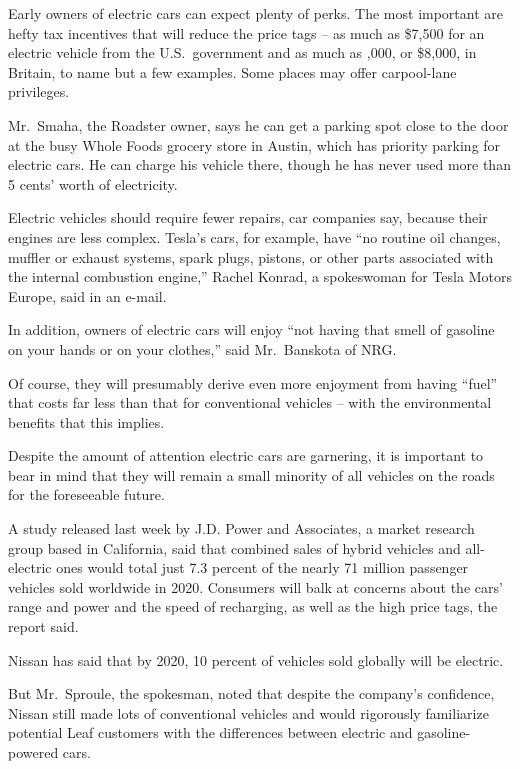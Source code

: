 ﻿\documentclass[12pt]{article}
\begin{document}
Early owners of electric cars can expect plenty of perks. The most important are hefty tax
incentives that will reduce the price tags -- as much as \$7,500 for an electric vehicle from the
U.S.~government and as much as ,000, or \$8,000, in Britain, to name but a few
examples. Some places may offer carpool-lane privileges.

Mr.~Smaha, the Roadster owner, says he can get a parking spot close to the door at the busy Whole
Foods grocery store in Austin, which has priority parking for electric cars. He can charge his
vehicle there, though he has never used more than 5 cents' worth of electricity.

Electric vehicles should require fewer repairs, car companies say, because their engines are less
complex. Tesla's cars, for example, have ``no routine oil changes, muffler or exhaust systems, spark
plugs, pistons, or other parts associated with the internal combustion engine,'' Rachel Konrad, a
spokeswoman for Tesla Motors Europe, said in an e-mail.

In addition, owners of electric cars will enjoy ``not having that smell of gasoline on your hands or
on your clothes,'' said Mr.~Banskota of NRG.

Of course, they will presumably derive even more enjoyment from having ``fuel'' that costs far less
than that for conventional vehicles -- with the environmental benefits that this implies.

Despite the amount of attention electric cars are garnering, it is important to bear in mind that
they will remain a small minority of all vehicles on the roads for the foreseeable future.

A study released last week by J.D. Power and Associates, a market research group based in
California, said that combined sales of hybrid vehicles and all-electric ones would total just 7.3
percent of the nearly 71 million passenger vehicles sold worldwide in 2020. Consumers will balk at
concerns about the cars' range and power and the speed of recharging, as well as the high price
tags, the report said.

Nissan has said that by 2020, 10 percent of vehicles sold globally will be electric.

But Mr.~Sproule, the spokesman, noted that despite the company's confidence, Nissan still made lots
of conventional vehicles and would rigorously familiarize potential Leaf customers with the
differences between electric and gasoline-powered cars.
\end{document}
